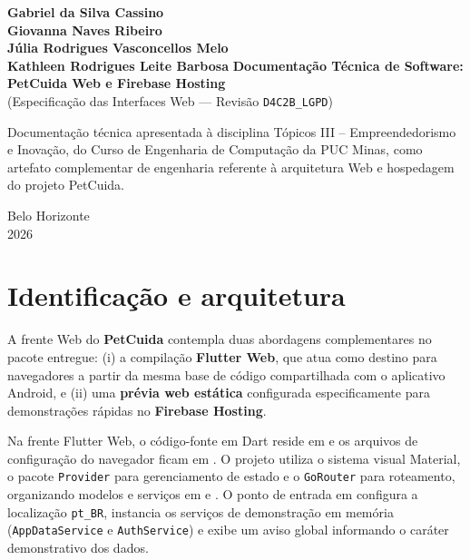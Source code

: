 \documentclass[12pt,a4paper]{article}
\begin{document}
\begin{titlepage}
\begin{center}
{\large\textbf{Gabriel da Silva Cassino}}\\
{\large\textbf{Giovanna Naves Ribeiro}}\\
{\large\textbf{Júlia Rodrigues Vasconcellos Melo}}\\
{\large\textbf{Kathleen Rodrigues Leite Barbosa}}
\vfill
{\Large\textbf{Documentação Técnica de Software: PetCuida Web e Firebase Hosting}}\\
{\large (Especificação das Interfaces Web --- Revisão \texttt{D4C2B\_LGPD})}
\vfill
\end{center}
\begin{flushright}
\begin{minipage}{8cm}
\small Documentação técnica apresentada à disciplina Tópicos III -- Empreendedorismo e Inovação, do Curso de Engenharia de Computação da PUC Minas, como artefato complementar de engenharia referente à arquitetura Web e hospedagem do projeto PetCuida.
\end{minipage}
\end{flushright}
\vfill
\begin{center}Belo Horizonte\\2026\end{center}
\end{titlepage}

\tableofcontents
\newpage

\section{Identificação e arquitetura}
A frente Web do \textbf{PetCuida} contempla duas abordagens complementares no pacote entregue: (i) a compilação \textbf{Flutter Web}, que atua como destino para navegadores a partir da mesma base de código compartilhada com o aplicativo Android, e (ii) uma \textbf{prévia web estática} configurada especificamente para demonstrações rápidas no \textbf{Firebase Hosting}.

Na frente Flutter Web, o código-fonte em Dart reside em  e os arquivos de configuração do navegador ficam em . O projeto utiliza o sistema visual Material, o pacote \texttt{Provider} para gerenciamento de estado e o \texttt{GoRouter} para roteamento, organizando modelos e serviços em  e . O ponto de entrada em  configura a localização \texttt{pt\_BR}, instancia os serviços de demonstração em memória (\texttt{AppDataService} e \texttt{AuthService}) e exibe um aviso global informando o caráter demonstrativo dos dados.
\end{document}
